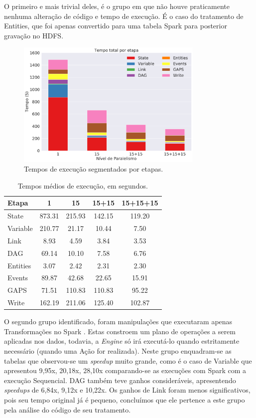 O primeiro e mais trivial deles, é o grupo em que não houve praticamente 
nenhuma alteração de código e tempo de execução. É o caso do tratamento de 
Entities, que foi apenas convertido para uma tabela Spark para posterior 
gravação no HDFS.

\begin{figure}[H]
\centerline{
\includegraphics[width=0.8\textwidth]{./img/total_step.pdf}}
 \caption{Tempos de execução segmentados por etapas.}
 \label{fig:total_step}
\end{figure}


\begin{table}[ht]
\centering
\small
\begin{tabular}{l c c c c} \toprule
\textbf{Etapa}  & \textbf{1} & \textbf{15} & \textbf{15+15} & 
\textbf{15+15+15}\\ 
\midrule
State		& 873.31 & 215.93 & 142.15 & 119.20\\
Variable  	& 210.77 & 21.17  & 10.44  & 7.50 \\
Link      	& 8.93   & 4.59   & 3.84   & 3.53 \\
DAG        	& 69.14  & 10.10  & 7.58   & 6.76 \\
Entities	& 3.07   & 2.42   & 2.31   & 2.30 \\
Events		& 89.87  & 42.68  & 22.65  & 15.91\\
GAPS		& 71.51  & 110.83 & 110.83 & 95.22\\
Write		& 162.19 & 211.06 & 125.40 & 102.87\\
\end{tabular}
\caption{Tempos médios de execução, em segundos.}
\label{tab:total_step}
\end{table}

O segundo grupo identificado, foram manipulações que executaram apenas 
Transformações no Spark \cite{ref:sparkbook}. Estas constroem um plano de 
operações a serem aplicadas nos dados, todavia, a \emph{Engine} só irá 
executá-lo quando estritamente necessário (quando uma Ação for realizada). 
Neste grupo enquadram-se as tabelas que observou-se um \emph{speedup} muito 
grande, como é o caso de Variable que apresentou 9,95x, 20,18x, 28,10x 
comparando-se as execuções com Spark com a execução Sequencial. DAG também teve 
ganhos consideráveis, apresentendo \emph{speedups} de 6,84x, 9,12x e 10,22x. Os 
ganhos de Link foram menos significativos, pois seu tempo original já é pequeno, 
concluímos que ele pertence a este grupo pela análise do código de seu 
tratamento.

